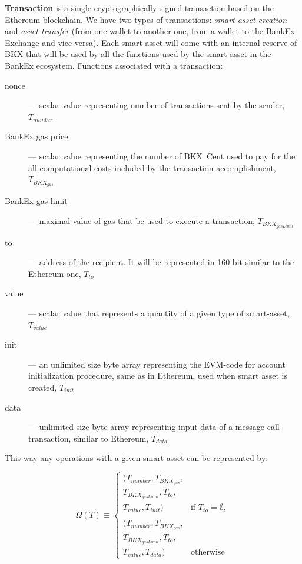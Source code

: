 \documentclass{article}
\begin{document}
\begin{multicols}{2}
\textbf{Transaction} is a single cryptographically signed transaction based on the Ethereum blockchain. We have two types of transactions: \textit{smart-asset creation} and \textit{asset transfer} (from one wallet to another one, from a wallet to the BankEx Exchange and vice-versa). Each smart-asset will come with an internal reserve of BKX that will be used by all the functions used by the smart asset in the BankEx ecosystem. Functions associated with a transaction:

\begin{description}
\item[nonce]--- scalar value representing number of transactions sent by the sender, $T_{number}$
\item[BankEx gas price]--- scalar value representing the number of BKX~Cent used to pay for the all computational costs included by the transaction accomplishment, $T_{BKX_{gas}}$
\item[BankEx gas limit]--- maximal value of gas that be used to execute a transaction, $T_{BKX_{gasLimit}}$
\item[to]--- address of the recipient. It will be represented in 160-bit similar to the Ethereum one, $T_{to}$
\item[value]--- scalar value that represents a quantity of a given type of smart-asset, $T_{value}$
\item[init]--- an unlimited size byte array representing the EVM-code for account initialization procedure, same as in Ethereum, used when smart asset is created, $T_{init}$
\item[data]--- unlimited size byte array representing input data of a message call transaction, similar to Ethereum, $T_{data}$
\end{description}

This way any operations with a given smart asset can be represented by:

\begin{equation}
    \Omega(T) \equiv
    \begin{cases} 
        (T_{number}, T_{BKX_{gas}}, \\T_{BKX_{gasLimit}}, T_{to}, \\T_{value}, T_{init}) & \text{if } T_{to} = \emptyset, \\
        \\
        (T_{number}, T_{BKX_{gas}}, \\T_{BKX_{gasLimit}}, T_{to}, \\T_{value}, T_{data}) & \text{otherwise}
    \end{cases}
\end{equation}


\end{multicols}
\end{document}
